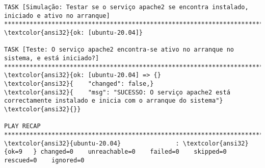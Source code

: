 \documentclass{scrartcl}
\begin{document}
\begin{Verbatim}
TASK [Simulação: Testar se o serviço apache2 se encontra instalado, iniciado e ativo no arranque] *******************************************************************************************
\textcolor{ansi32}{ok: [ubuntu-20.04]}

TASK [Teste: O serviço apache2 encontra-se ativo no arranque no sistema, e está iniciado?] **************************************************************************************************
\textcolor{ansi32}{ok: [ubuntu-20.04] => {}
\textcolor{ansi32}{    "changed": false,}
\textcolor{ansi32}{    "msg": "SUCESSO: O serviço apache2 está correctamente instalado e inicia com o arranque do sistema"}
\textcolor{ansi32}{}}

PLAY RECAP **********************************************************************************************************************************************************************************
\textcolor{ansi32}{ubuntu-20.04}               : \textcolor{ansi32}{ok=9   } changed=0    unreachable=0    failed=0    skipped=0    rescued=0    ignored=0


\end{Verbatim}
\end{document}
